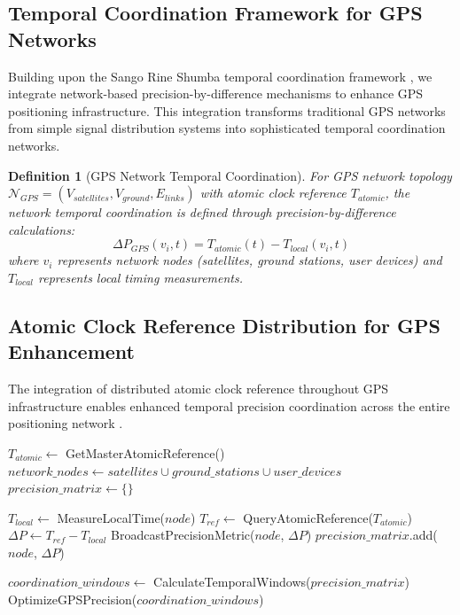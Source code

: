 \documentclass[12pt,a4paper]{article}
\newtheorem{definition}[theorem]{Definition}
\begin{document}
\subsection{Temporal Coordination Framework for GPS Networks}

Building upon the Sango Rine Shumba temporal coordination framework \cite{sachikonye2025sango}, we integrate network-based precision-by-difference mechanisms to enhance GPS positioning infrastructure. This integration transforms traditional GPS networks from simple signal distribution systems into sophisticated temporal coordination networks.

\begin{definition}[GPS Network Temporal Coordination]
For GPS network topology $\mathcal{N}_{GPS} = (V_{satellites}, V_{ground}, E_{links})$ with atomic clock reference $T_{atomic}$, the network temporal coordination is defined through precision-by-difference calculations:
\begin{equation}
\Delta P_{GPS}(v_i, t) = T_{atomic}(t) - T_{local}(v_i, t)
\end{equation}
where $v_i$ represents network nodes (satellites, ground stations, user devices) and $T_{local}$ represents local timing measurements.
\end{definition}

\subsection{Atomic Clock Reference Distribution for GPS Enhancement}

The integration of distributed atomic clock reference throughout GPS infrastructure enables enhanced temporal precision coordination across the entire positioning network \cite{mills1991ntp,lamport1978time}.

\begin{algorithm}
\caption{GPS Network Atomic Reference Synchronization}
\begin{algorithmic}[1]
    \State $T_{atomic} \gets$ GetMasterAtomicReference()
    \State $network\_nodes \gets satellites \cup ground\_stations \cup user\_devices$
    \State $precision\_matrix \gets \{\}$
    
        \State $T_{local} \gets$ MeasureLocalTime($node$)
        \State $T_{ref} \gets$ QueryAtomicReference($T_{atomic}$)
        \State $\Delta P \gets T_{ref} - T_{local}$
        \State BroadcastPrecisionMetric($node$, $\Delta P$)
        \State $precision\_matrix$.add($node$, $\Delta P$)
    \EndFor
    
    \State $coordination\_windows \gets$ CalculateTemporalWindows($precision\_matrix$)
    \State \Return OptimizeGPSPrecision($coordination\_windows$)
\EndProcedure
\end{algorithmic}
\end{algorithm}
\end{document}
